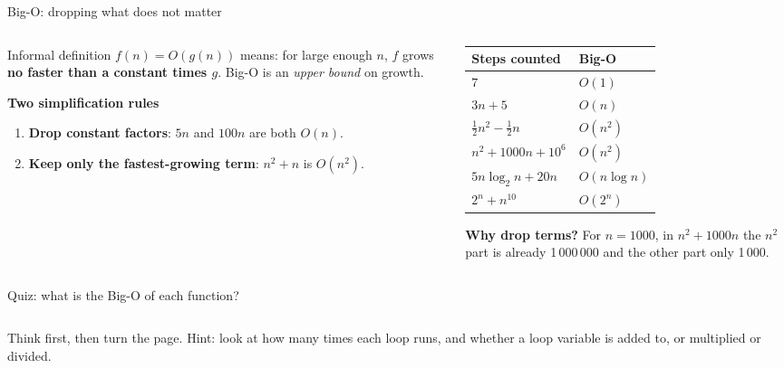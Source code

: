 \documentclass[aspectratio=169,10pt]{beamer}
\begin{document}
\begin{frame}{Big-O: dropping what does not matter}
\begin{columns}[T]
\begin{column}{0.5\textwidth}
\begin{block}{Informal definition}
{\small $f(n)=O(g(n))$ means: for large enough $n$, $f$ grows \textbf{no faster than a constant times $g$}. Big-O is an \emph{upper bound} on growth.}
\end{block}
\vspace{2mm}
{\small
\textbf{Two simplification rules}
\begin{enumerate}\setlength\itemsep{2pt}
\item \textbf{Drop constant factors}: $5n$ and $100n$ are both $O(n)$.
\item \textbf{Keep only the fastest-growing term}: $n^2+n$ is $O(n^2)$.
\end{enumerate}}
\end{column}
\begin{column}{0.46\textwidth}
\renewcommand{\arraystretch}{1.3}\small
\begin{tabular}{@{}ll@{}}
\toprule
Steps counted & Big-O\\\midrule
$7$ & $O(1)$\\
$3n+5$ & $O(n)$\\
$\tfrac12 n^2-\tfrac12 n$ & $O(n^2)$\\
$n^2+1000n+10^6$ & $O(n^2)$\\
$5n\log_2 n+20n$ & $O(n\log n)$\\
$2^n+n^{10}$ & $O(2^n)$\\
\bottomrule
\end{tabular}
\vspace{3mm}

{\small \textbf{Why drop terms?} For $n=1000$, in $n^2+1000n$ the $n^2$ part is already 1\,000\,000 and the other part only 1\,000.}
\end{column}
\end{columns}
\end{frame}

\begin{frame}{Quiz: what is the Big-O of each function?}
\begin{columns}[T]
\begin{column}{0.48\textwidth}
\vspace{2mm}
\end{column}
\begin{column}{0.48\textwidth}
\vspace{2mm}
\end{column}
\end{columns}
\vspace{2mm}
{\small Think first, then turn the page. Hint: look at how many times each loop runs, and whether a loop variable is added to, or multiplied or divided.}
\end{frame}
\end{document}
